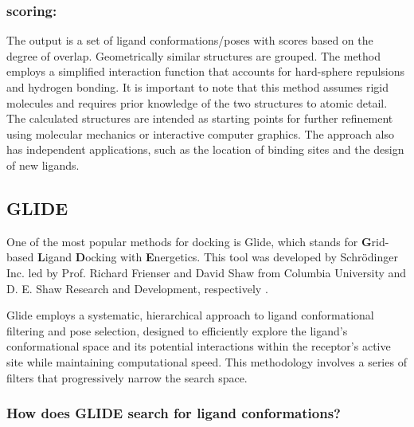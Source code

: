 \documentclass[11pt]{article}
\begin{document}
\subsubsection*{scoring:}
The output is a set of ligand conformations/poses with scores based on the degree of overlap. Geometrically similar structures are grouped. The method employs a simplified interaction function that accounts for hard-sphere repulsions and hydrogen bonding. It is important to note that this method assumes rigid molecules and requires prior knowledge of the two structures to atomic detail. The calculated structures are intended as starting points for further refinement using molecular mechanics or interactive computer graphics. The approach also has independent applications, such as the location of binding sites and the design of new ligands.

\subsection*{GLIDE}
One of the most popular methods for docking is Glide, which stands for \textbf{G}rid-based \textbf{L}igand \textbf{D}ocking with \textbf{E}nergetics. This tool was developed by Schrödinger Inc. led by Prof. Richard Frienser and David Shaw from Columbia University and D. E. Shaw Research and Development, respectively \cite{glide001}.

Glide employs a systematic, hierarchical approach to ligand conformational filtering and pose selection, designed to efficiently explore the ligand's conformational space and its potential interactions within the receptor's active site while maintaining computational speed. This methodology involves a series of filters that progressively narrow the search space.
\subsubsection*{How does GLIDE search for ligand conformations?}
\end{document}
